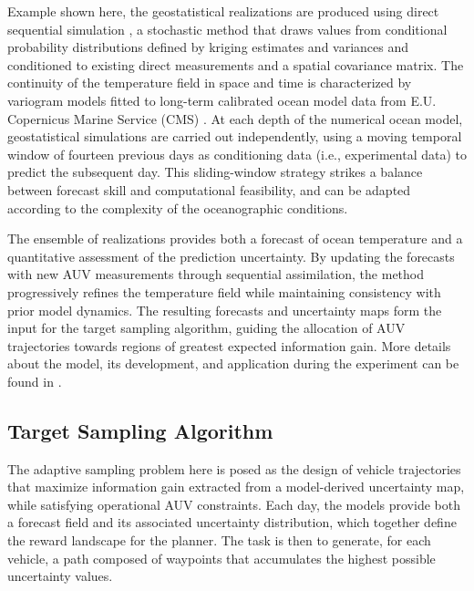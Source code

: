 Example shown here, the geostatistical realizations are produced using
direct sequential simulation \cite{soares2001direct}, a stochastic
method that draws values from conditional probability distributions
defined by kriging estimates and variances and conditioned to existing
direct measurements and a spatial covariance matrix. The continuity of
the temperature field in space and time is characterized by variogram
models fitted to long-term calibrated ocean model data from
E.U. Copernicus Marine Service (CMS) \cite{CMEMS2017}. At each depth
of the numerical ocean model, geostatistical simulations are carried
out independently, using a moving temporal window of fourteen previous
  days as
conditioning data (i.e., experimental data) to predict the subsequent
day. This sliding-window strategy strikes a balance between forecast
skill and computational feasibility, and can be adapted according to
the complexity of the oceanographic conditions.

The ensemble of realizations provides both a forecast of ocean
temperature and a quantitative assessment of the prediction
uncertainty.  By updating the forecasts with new AUV measurements
through sequential assimilation, the method progressively refines the
temperature field while maintaining consistency with prior model
dynamics. The resulting forecasts and uncertainty maps form the input
for the target sampling algorithm, guiding the allocation of AUV
trajectories towards regions of greatest expected information
gain. More details about the model, its development, and application
during the \proj experiment can be found in \cite{Duarte2025}.

\subsection{Target Sampling Algorithm}

The adaptive sampling problem here is posed as the design of vehicle
trajectories that maximize information gain
\cite{eidsvik2015,fossum18} extracted from a model-derived uncertainty
map, while satisfying operational AUV constraints. Each day, the
models provide both a forecast field and its associated uncertainty
distribution, which together define the reward landscape for the
planner. The task is then to generate, for each vehicle, a path
composed of waypoints that accumulates the highest possible
uncertainty values.

